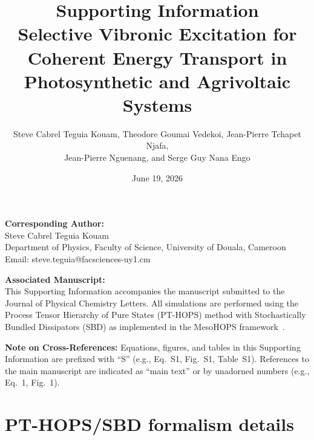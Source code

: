 \documentclass[11pt,a4paper]{article}
\begin{document}
\title{\textbf{Supporting Information}\\[0.5em]
\large Selective Vibronic Excitation for Coherent Energy Transport in Photosynthetic and Agrivoltaic Systems}

\author{Steve Cabrel Teguia Kouam, Theodore Goumai Vedekoi, Jean-Pierre Tchapet Njafa,\\ Jean-Pierre Nguenang, and Serge Guy Nana Engo}

\date{June 19, 2026}

\maketitle

\noindent\textbf{Corresponding Author:}\\
Steve Cabrel Teguia Kouam\\
Department of Physics, Faculty of Science, University of Douala, Cameroon\\
Email: steve.teguia@facsciences-uy1.cm

\vspace{1em}
\noindent\textbf{Associated Manuscript:}\\
This Supporting Information accompanies the manuscript submitted to the Journal of Physical Chemistry Letters. All simulations are performed using the Process Tensor Hierarchy of Pure States (PT-HOPS) method with Stochastically Bundled Dissipators (SBD) as implemented in the MesoHOPS framework~\cite{Varvelo2021,Citty2024}.

\tableofcontents

\newpage

\noindent\textbf{Note on Cross-References:} Equations, figures, and tables in this Supporting Information are prefixed with ``S'' (e.g., Eq.~S1, Fig.~S1, Table~S1). References to the main manuscript are indicated as ``main text'' or by unadorned numbers (e.g., Eq.~1, Fig.~1).

\vspace{1em}


\section{PT-HOPS/SBD formalism details}
\label{sec:formalism}
\end{document}
